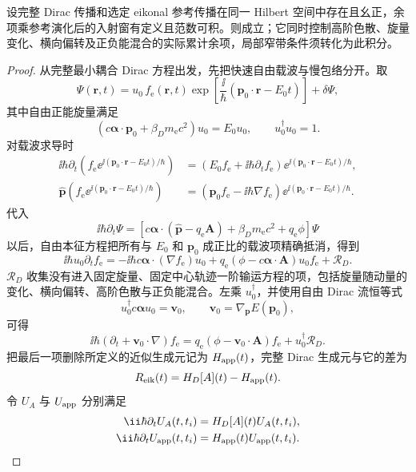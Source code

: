 \begin{proposition}[固定轨迹包络的传播误差]
设完整 Dirac 传播和选定 eikonal 参考传播在同一 Hilbert 空间中存在且幺正，余项乘参考演化后的入射窗有定义且范数可积。则成立；它同时控制高阶色散、旋量变化、横向偏转及正负能混合的实际累计余项，局部窄带条件须转化为此积分。
\end{proposition}
\begin{proof}
从完整最小耦合 Dirac 方程出发，先把快速自由载波与慢包络分开。取
\[
\Psi(\mathbf r,t)
=u_0\,f_{\mathrm e}(\mathbf r,t)
\exp\!\left[\frac{\ii}{\hbar}(\mathbf p_0\cdot\mathbf r-E_0t)\right]
+\delta\Psi,
\]
其中自由正能旋量满足
\[
\left(c\boldsymbol\alpha\cdot\mathbf p_0+\beta_Dm_{\mathrm e} c^2\right)u_0=E_0u_0,
\qquad u_0^\dagger u_0=1.
\]
对载波求导时
\begin{align*}
\ii\hbar\partial_t(f_{\mathrm e}\ee^{\ii(\mathbf p_0\cdot\mathbf r-E_0t)/\hbar})
&=\left(E_0f_{\mathrm e}+\ii\hbar\partial_tf_{\mathrm e}\right)
\ee^{\ii(\mathbf p_0\cdot\mathbf r-E_0t)/\hbar},\\
\hat{\mathbf p}(f_{\mathrm e}\ee^{\ii(\mathbf p_0\cdot\mathbf r-E_0t)/\hbar})
&=\left(\mathbf p_0f_{\mathrm e}-\ii\hbar\nabla f_{\mathrm e}\right)
\ee^{\ii(\mathbf p_0\cdot\mathbf r-E_0t)/\hbar}.
\end{align*}
代入
\[
\ii\hbar\partial_t\Psi=
\left[c\boldsymbol\alpha\cdot(\hat{\mathbf p}-q_{\mathrm e}\mathbf A)
+\beta_Dm_{\mathrm e} c^2+q_{\mathrm e}\phi\right]\Psi
\]
以后，自由本征方程把所有与 $E_0$ 和 $\mathbf p_0$ 成正比的载波项精确抵消，得到
\[
\ii\hbar u_0\partial_tf_{\mathrm e}
=-\ii\hbar c\boldsymbol\alpha\cdot(\nabla f_{\mathrm e})u_0
+q_{\mathrm e}(\phi-c\boldsymbol\alpha\cdot\mathbf A)u_0f_{\mathrm e}
+\mathcal R_D.
\]
$\mathcal R_D$ 收集没有进入固定旋量、固定中心轨迹一阶输运方程的项，包括旋量随动量的变化、横向偏转、高阶色散与正负能混合。左乘 $u_0^\dagger$，并使用自由 Dirac 流恒等式
\[
u_0^\dagger c\boldsymbol\alpha u_0=\mathbf v_0,
\qquad
\mathbf v_0=\nabla_{\mathbf p}E(\mathbf p_0),
\]
可得
\[
\ii\hbar(\partial_t+\mathbf v_0\cdot\nabla)f_{\mathrm e}
=q_{\mathrm e}(\phi-\mathbf v_0\cdot\mathbf A)f_{\mathrm e}
+u_0^\dagger\mathcal R_D.
\]
把最后一项删除所定义的近似生成元记为 $H_{\rm app}(t)$，完整 Dirac 生成元与它的差为
\[
R_{\rm eik}(t)=H_D[A](t)-H_{\rm app}(t).
\]
令 $U_A$ 与 $U_{\rm app}$ 分别满足
\begin{align*}
\ii\hbar\partial_tU_A(t,t_i)&=H_D[A](t)U_A(t,t_i),\\
\ii\hbar\partial_tU_{\rm app}(t,t_i)&=H_{\rm app}(t)U_{\rm app}(t,t_i).
\end{align*}

\end{proof}
